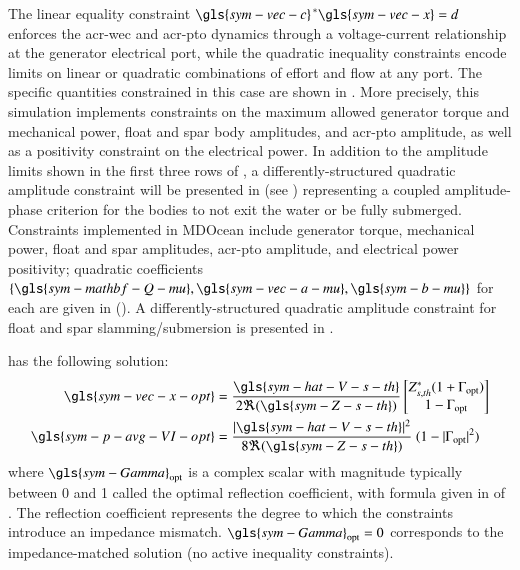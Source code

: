 The linear equality constraint $\gls{sym-vec-c}^{\,*}\gls{sym-vec-x} = d$ enforces the \gls{acr-wec} and \gls{acr-pto} dynamics through a voltage-current relationship at the generator electrical port, while the quadratic inequality constraints encode limits on linear or quadratic combinations of effort and flow at any port.
\ifdefined\DISSERTATION
    The specific quantities constrained in this case are shown in .
    More precisely, this simulation implements constraints on the maximum allowed generator torque and mechanical power, float and spar body amplitudes, and \gls{acr-pto} amplitude, as well as a positivity constraint on the electrical power.
    In addition to the amplitude limits shown in the first three rows of , a differently-structured quadratic amplitude constraint will be presented in  (see ) representing a coupled amplitude-phase criterion for the bodies to not exit the water or be fully submerged.
\else
    Constraints implemented in MDOcean include generator torque, mechanical power, float and spar amplitudes, \gls{acr-pto} amplitude, and electrical power positivity; quadratic coefficients $\{\gls{sym-mathbf-Q-mu}, \gls{sym-vec-a-mu}, \gls{sym-b-mu}\}$ for each are given in  ().
    A differently-structured quadratic amplitude constraint for float and spar slamming/submersion is presented in .
\fi

 has the following solution:
\begin{equation}\label{eq:constrained-qp-solution}
\begin{aligned}
    \gls{sym-vec-x-opt} &=
    \frac{\gls{sym-hat-V-s-th}}{2\Re (\gls{sym-Z-s-th})}
        \begin{bmatrix} Z_{s,th}^* (1+\Gamma_{\text{opt}}) \\ 1-\Gamma_{\text{opt}} \end{bmatrix} \\
    \gls{sym-p-avg-VI-opt} &= \frac{|\gls{sym-hat-V-s-th}|^2}{8\Re (\gls{sym-Z-s-th})}~ (1 - |\Gamma_{\text{opt}}|^2)
\end{aligned}
\end{equation}
where $\gls{sym-Gamma}_{\text{opt}}$ is a complex scalar with magnitude typically between 0 and 1 called the optimal reflection coefficient, with formula given in  of .
The reflection coefficient represents the degree to which the constraints introduce an impedance mismatch.
$\gls{sym-Gamma}_{\text{opt}}=0$ corresponds to the impedance-matched solution (no active inequality constraints).

